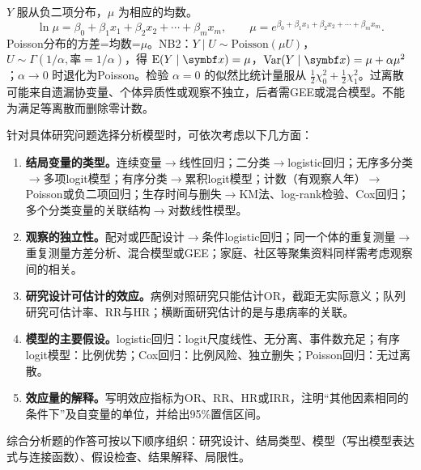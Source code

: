 $Y$ 服从负二项分布，$\mu$ 为相应的均数。
\[
\ln\mu=\beta_0+\beta_1x_1+\beta_2x_2+\cdots+\beta_mx_m,\qquad
\mu=e^{\beta_0+\beta_1x_1+\beta_2x_2+\cdots+\beta_mx_m}.
\]
Poisson分布的方差=均数=$\mu$。NB2：$Y\mid U\sim\text{Poisson}(\mu U)$，$U\sim\Gamma(1/\alpha,\text{率}=1/\alpha)$，得 $\E(Y\mid\bm x)=\mu$，$\Var(Y\mid\bm x)=\mu+\alpha\mu^2$；$\alpha\to0$ 时退化为Poisson。检验 $\alpha=0$ 的似然比统计量服从 $\tfrac12\chi^2_0+\tfrac12\chi^2_1$。过离散可能来自遗漏协变量、个体异质性或观察不独立，后者需GEE或混合模型。不能为满足等离散而删除零计数。

\begin{sikao}[模型选择的一般步骤]
针对具体研究问题选择分析模型时，可依次考虑以下几方面：
\begin{enumerate}
\item \textbf{结局变量的类型。}连续变量$\to$线性回归；二分类$\to$logistic回归；无序多分类$\to$多项logit模型；有序分类$\to$累积logit模型；计数（有观察人年）$\to$Poisson或负二项回归；生存时间与删失$\to$KM法、log-rank检验、Cox回归；多个分类变量的关联结构$\to$对数线性模型。
\item \textbf{观察的独立性。}配对或匹配设计$\to$条件logistic回归；同一个体的重复测量$\to$重复测量方差分析、混合模型或GEE；家庭、社区等聚集资料同样需考虑观察间的相关。
\item \textbf{研究设计可估计的效应。}病例对照研究只能估计OR，截距无实际意义；队列研究可估计率、RR与HR；横断面研究估计的是与患病率的关联。
\item \textbf{模型的主要假设。}logistic回归：logit尺度线性、无分离、事件数充足；有序logit模型：比例优势；Cox回归：比例风险、独立删失；Poisson回归：无过离散。
\item \textbf{效应量的解释。}写明效应指标为OR、RR、HR或IRR，注明“其他因素相同的条件下”及自变量的单位，并给出95\%置信区间。
\end{enumerate}
综合分析题的作答可按以下顺序组织：研究设计、结局类型、模型（写出模型表达式与连接函数）、假设检查、结果解释、局限性。
\end{sikao}
